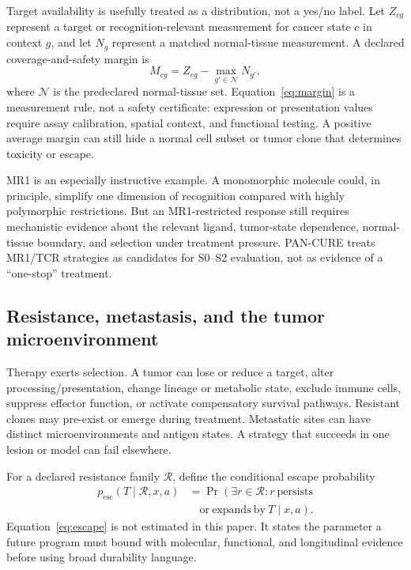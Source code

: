 \documentclass[10pt,conference]{IEEEtran}
\begin{document}
Target availability is usefully treated as a distribution, not a yes/no label. Let $Z_{cg}$ represent a target or recognition-relevant measurement for cancer state $c$ in context $g$, and let $N_g$ represent a matched normal-tissue measurement. A declared coverage-and-safety margin is
\begin{equation}
M_{cg}=Z_{cg}-\max_{g'\in\mathcal{N}}N_{g'},\label{eq:margin}
\end{equation}
where $\mathcal{N}$ is the predeclared normal-tissue set. Equation~\eqref{eq:margin} is a measurement rule, not a safety certificate: expression or presentation values require assay calibration, spatial context, and functional testing. A positive average margin can still hide a normal cell subset or tumor clone that determines toxicity or escape.

MR1 is an especially instructive example. A monomorphic molecule could, in principle, simplify one dimension of recognition compared with highly polymorphic restrictions. But an MR1-restricted response still requires mechanistic evidence about the relevant ligand, tumor-state dependence, normal-tissue boundary, and selection under treatment pressure. PAN-CURE treats MR1/TCR strategies as candidates for S0--S2 evaluation, not as evidence of a ``one-stop'' treatment.

\subsection{Resistance, metastasis, and the tumor microenvironment}
Therapy exerts selection. A tumor can lose or reduce a target, alter processing/presentation, change lineage or metabolic state, exclude immune cells, suppress effector function, or activate compensatory survival pathways. Resistant clones may pre-exist or emerge during treatment. Metastatic sites can have distinct microenvironments and antigen states. A strategy that succeeds in one lesion or model can fail elsewhere.

For a declared resistance family $\mathcal{R}$, define the conditional escape probability
\begin{align}
p_{\mathrm{esc}}(T\mid\mathcal{R},x,a)&=\Pr\left(\exists r\in\mathcal{R}:r\ \mathrm{persists}\right.\nonumber\\
&\left.\quad\mathrm{or\ expands\ by}\ T\mid x,a\right).\label{eq:escape}
\end{align}
Equation~\eqref{eq:escape} is not estimated in this paper. It states the parameter a future program must bound with molecular, functional, and longitudinal evidence before using broad durability language.
\end{document}
